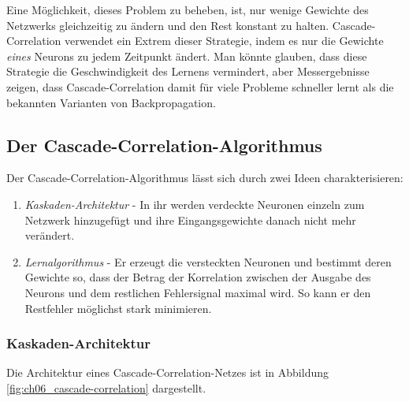 Eine Möglichkeit, dieses Problem zu beheben, ist, nur wenige Gewichte des Netzwerks gleichzeitig zu ändern und den Rest konstant zu halten.
Cascade-Correlation verwendet ein Extrem dieser Strategie, indem es nur die Gewichte \emph{eines} Neurons zu jedem Zeitpunkt ändert.
Man könnte glauben, dass diese Strategie die Geschwindigkeit des Lernens vermindert, aber Messergebnisse zeigen, dass Cascade-Correlation damit für viele Probleme schneller lernt als die bekannten Varianten von Backpropagation.

\subsection*{Der Cascade-Correlation-Algorithmus}
Der Cascade-Correlation-Algorithmus lässt sich durch zwei Ideen charakterisieren:
\begin{enumerate}
	\item \emph{Kaskaden-Architektur} - In ihr werden verdeckte Neuronen einzeln zum Netzwerk hinzugefügt und ihre Eingangsgewichte danach nicht mehr verändert.
	\item \emph{Lernalgorithmus} - Er erzeugt die versteckten Neuronen und bestimmt deren Gewichte so, dass der Betrag der Korrelation zwischen der Ausgabe des Neurons und dem restlichen Fehlersignal maximal wird. So kann er den Restfehler möglichst stark minimieren.
\end{enumerate}

\subsubsection*{Kaskaden-Architektur}
Die Architektur eines Cascade-Correlation-Netzes ist in Abbildung \ref{fig:ch06_cascade-correlation} dargestellt.

